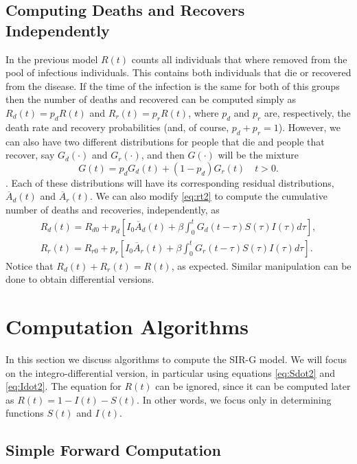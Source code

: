 \documentclass[twoside,USenglish,10pt]{article}
\newcommand{\Ab}{\overline{A}\xspace}
\begin{document}
\subsection{Computing Deaths and Recovers Independently}

In the previous model $R(t)$ counts all individuals that where removed from the pool of infectious individuals. This contains both individuals that die or recovered from the disease. If the time of the infection is the same for both of this groups then the number of deaths and recovered can be computed simply as $R_d(t)=p_dR(t)$ and $R_r(t)=p_rR(t)$, where $p_d$ and $p_r$ are, respectively, the death rate and recovery probabilities (and, of course, $p_d+p_r=1$).
However, we can also have  two different distributions for people that die and people that recover, say $G_d(\cdot)$ and $G_r(\cdot)$, and then $G(\cdot)$ will be the mixture
\[ G(t) = p_dG_d(t) + (1-p_d)G_r(t) \quad t>0.\]. Each of these distributions will have its corresponding residual distributions, $\Ab_d(t)$ and $\Ab_r(t)$.
We can also modify \eqref{eq:rt2} to compute the cumulative number of deaths and recoveries, independently, as
\begin{equation*}
	\begin{gathered}
		R_d(t) = R_{d0} + p_d[I_0\Ab_d(t) + \beta \int_0^t G_d(t-\tau) S(\tau)I(\tau)d\tau], \\
		R_r(t) = R_{r0} + p_r[I_0\Ab_r(t) + \beta \int_0^t G_r(t-\tau) S(\tau)I(\tau)d\tau].  
	\end{gathered}
\end{equation*}
Notice that $R_d(t) + R_r(t) = R(t)$, as expected. Similar manipulation can be done to obtain differential versions.


\section{Computation Algorithms}\label{sc:algorithm}

In this section we discuss algorithms to compute the SIR-G model. We will focus on the integro-differential version, in particular using equations \eqref{eq:Sdot2} and \eqref{eq:Idot2}. The equation for $R(t)$ can be ignored, since it can be computed later as $R(t)=1-I(t)-S(t)$. In other words, we focus only in determining functions $S(t)$ and $I(t)$.

\subsection{Simple Forward Computation}
\end{document}
